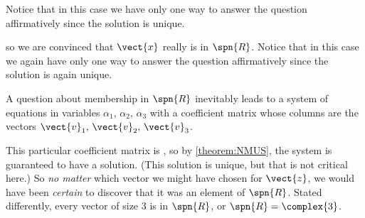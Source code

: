 \documentclass{ximera}
\begin{document}
\begin{example}
  \begin{question}
    \begin{multipleChoice}
    \end{multipleChoice}
    
    \begin{feedback}[correct]
      \begin{question}
        \begin{multipleChoice}
        \end{multipleChoice}

        \begin{feedback}[correct]
          Notice that in this case we have only one way to answer the
          question affirmatively since the solution is unique.
        \end{feedback}
      \end{question}
    \end{feedback}
  \end{question}

  \begin{question}
    \begin{multipleChoice}
    \end{multipleChoice}

    \begin{feedback}[correct]
      so we are convinced that $\vect{x}$ really is in $\spn{R}$.
      Notice that in this case we again have only one way to answer the
      question affirmatively since the solution is again unique.
    \end{feedback}
  \end{question}

  \begin{question}
    A question about membership in $\spn{R}$ inevitably leads to a
    system of  equations in  variables
    $\alpha_1,\,\alpha_2,\,\alpha_3$ with a coefficient matrix whose
    columns are the vectors $\vect{v}_1,\,\vect{v}_2,\,\vect{v}_3$.

    This particular coefficient matrix is
    , so by
    \ref{theorem:NMUS}, the system is guaranteed to have a solution.
    (This solution is unique, but that is not critical here.)  So
    \textit{no matter} which vector we might have chosen for
    $\vect{z}$, we would have been \textit{certain} to discover that
    it was an element of $\spn{R}$.  Stated differently, every vector
    of size 3 is in $\spn{R}$, or $\spn{R}=\complex{3}$.
  \end{question}
\end{example}
\end{document}
